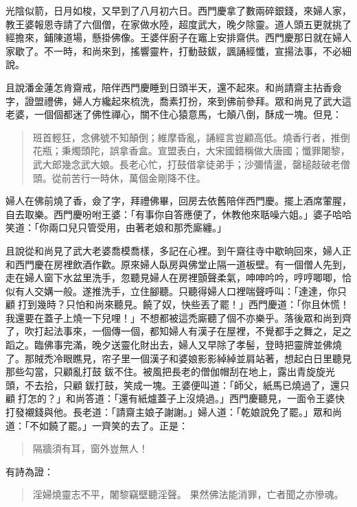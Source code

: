 光陰似箭，日月如梭，又早到了八月初六日。西門慶拿了數兩碎銀錢，來婦人家，教王婆報恩寺請了六個僧，在家做水陸，超度武大，晚夕除靈。道人頭五更就挑了經擔來，鋪陳道場，懸掛佛像。王婆伴廚子在竈上安排齋供。西門慶那日就在婦人家歇了。不一時，和尚來到，搖響靈杵，打動鼓鈸，諷誦經懺，宣揚法事，不必細說。

且說潘金蓮怎肯齋戒，陪伴西門慶睡到日頭半天，還不起來。和尚請齋主拈香僉字，證盟禮佛，婦人方纔起來梳洗，喬素打扮，來到佛前參拜。眾和尚見了武大這老婆，一個個都迷了佛性禪心，關不住心猿意馬，七顛八倒，酥成一塊。但見：
\begin{quote}
班首輕狂，念佛號不知顛倒；維摩昏亂，誦經言豈顧高低。燒香行者，推倒花瓶；秉燭頭陀，誤拿香盒。宣盟表白，大宋國錯稱做大唐國；懺罪闍黎，武大郎幾念武大娘。長老心忙，打鼓借拿徒弟手；沙彌情盪，罄槌敲破老僧頭。從前苦行一時休，萬個金剛降不住。
\end{quote}

婦人在佛前燒了香，僉了字，拜禮佛畢，回房去依舊陪伴西門慶。擺上酒席葷腥，自去取樂。西門慶吩咐王婆：「有事你自答應便了，休教他來聒噪六姐。」婆子哈哈笑道：「你兩口兒只管受用，由著老娘和那禿廝纏。」

且說從和尚見了武大老婆喬模喬樣，多記在心裡。到午齋往寺中歇晌回來，婦人正和西門慶在房裡飲酒作歡。原來婦人臥房與佛堂止隔一道板壁。有一個僧人先到，走在婦人窗下水盆里洗手，忽聽見婦人在房裡顫聲柔氣，呻呻吟吟，哼哼唧唧，恰似有人交媾一般。遂推洗手，立住腳聽。只聽得婦人口裡喘聲呼叫：「達達，你只顧𢵞打到幾時？只怕和尚來聽見。饒了奴，快些丟了罷！」西門慶道：「你且休慌！我還要在蓋子上燒一下兒哩！」不想都被這禿廝聽了個不亦樂乎。落後眾和尚到齊了，吹打起法事來，一個傳一個，都知婦人有漢子在屋裡，不覺都手之舞之，足之蹈之。臨佛事完滿，晚夕送靈化財出去，婦人又早除了孝髻，登時把靈牌並佛燒了。那賊禿冷眼瞧見，帘子里一個漢子和婆娘影影綽綽並肩站著，想起白日里聽見那些勾當，只顧亂打鼓𢵞鈸不住。被風把長老的僧伽帽刮在地上，露出青旋旋光頭，不去拾，只顧𢵞鈸打鼓，笑成一塊。王婆便叫道：「師父，紙馬已燒過了，還只顧𢵞打怎的？」和尚答道：「還有紙爐蓋子上沒燒過。」西門慶聽見，一面令王婆快打發襯錢與他。長老道：「請齋主娘子謝謝。」婦人道：「乾娘說免了罷。」眾和尚道：「不如饒了罷。」一齊笑的去了。正是：
\begin{quote}
隔牆須有耳，窗外豈無人！
\end{quote}
有詩為證：
\begin{quote}
淫婦燒靈志不平，闍黎竊壁聽淫聲。
果然佛法能消罪，亡者聞之亦慘魂。
\end{quote}
